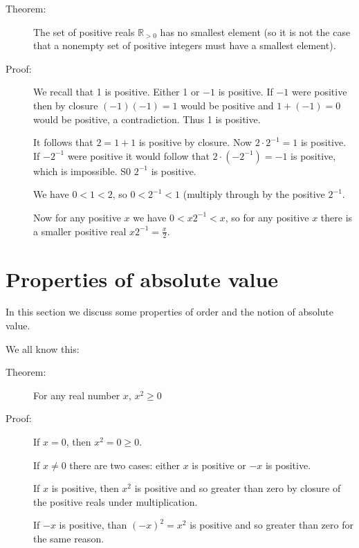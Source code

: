 \documentclass[12pt]{article}
\begin{document}
\begin{description}

\item[Theorem:]  The set of positive reals $\mathbb R_{>0}$ has no smallest element (so it is not the case that a nonempty set of positive integers must have a smallest element).

\item[Proof:]  We recall that 1 is positive.  Either 1 or $-1$ is positive.  If $-1$ were positive then by closure $(-1)(-1) = 1$ would be positive and $1+(-1) = 0$ would be positive, a contradiction.  Thus 1 is positive.

It follows that $2 =1+1$ is positive by closure.  Now $2\cdot 2^{-1} = 1$ is positive.  If $-2^{-1}$ were positive it would follow that $2\cdot (-2^{-1}) = -1$ is positive, which is impossible.  S0 $2^{-1}$ is positive.

We have $0<1<2$, so $0<2^{-1}<1$ (multiply through by the positive $2^{-1}$.

Now for any positive $x$ we have $0<x2^{-1}<x$, so for any positive $x$ there is a smaller positive real $x2^{-1} = \frac x2$.

\end{description}

\newpage

\section{Properties of absolute value}

In this section we discuss some properties of order and the notion of absolute value.

We all know this:

\begin{description}

\item[Theorem:]  For any real number $x$, $x^2\geq 0$

\item[Proof:]  If $x=0$, then $x^2=0 \geq 0$.

If $x \neq 0$ there are two cases:  either $x$ is positive or $-x$ is positive.

If $x$ is positive, then $x^2$ is positive and so greater than zero by closure of the positive reals under multiplication.

If $-x$ is positive, than $(-x)^2 = x^2$ is positive and so greater than zero for the same reason.

\end{description}
\end{document}
